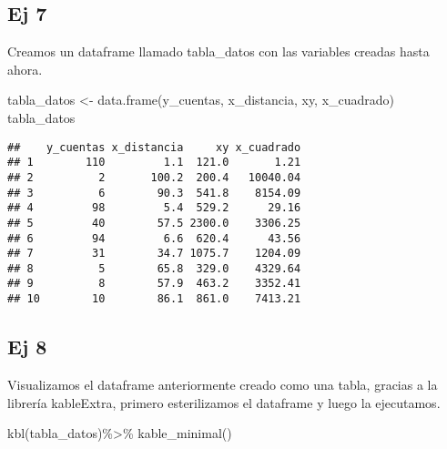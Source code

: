 \documentclass[
]{article}
\newenvironment{Shaded}{\begin{snugshade}}{\end{snugshade}}
\newcommand{\FunctionTok}[1]{\textcolor[rgb]{0.00,0.00,0.00}{#1}}
\newcommand{\NormalTok}[1]{#1}
\newcommand{\OtherTok}[1]{\textcolor[rgb]{0.56,0.35,0.01}{#1}}
\newcommand{\SpecialCharTok}[1]{\textcolor[rgb]{0.00,0.00,0.00}{#1}}
\begin{document}
\hypertarget{ej-7}{%
\subsection{Ej 7}\label{ej-7}}

Creamos un dataframe llamado tabla\_datos con las variables creadas
hasta ahora.

\begin{Shaded}
\begin{Highlighting}[]
\NormalTok{tabla\_datos }\OtherTok{\textless{}{-}} \FunctionTok{data.frame}\NormalTok{(y\_cuentas, x\_distancia, xy, x\_cuadrado)}
\NormalTok{tabla\_datos}
\end{Highlighting}
\end{Shaded}

\begin{verbatim}
##    y_cuentas x_distancia     xy x_cuadrado
## 1        110         1.1  121.0       1.21
## 2          2       100.2  200.4   10040.04
## 3          6        90.3  541.8    8154.09
## 4         98         5.4  529.2      29.16
## 5         40        57.5 2300.0    3306.25
## 6         94         6.6  620.4      43.56
## 7         31        34.7 1075.7    1204.09
## 8          5        65.8  329.0    4329.64
## 9          8        57.9  463.2    3352.41
## 10        10        86.1  861.0    7413.21
\end{verbatim}

\hypertarget{ej-8}{%
\subsection{Ej 8}\label{ej-8}}

Visualizamos el dataframe anteriormente creado como una tabla, gracias a
la librería kableExtra, primero esterilizamos el dataframe y luego la
ejecutamos.

\begin{Shaded}
\begin{Highlighting}[]
\FunctionTok{kbl}\NormalTok{(tabla\_datos)}\SpecialCharTok{\%\textgreater{}\%}
  \FunctionTok{kable\_minimal}\NormalTok{()}
\end{Highlighting}
\end{Shaded}
\end{document}
